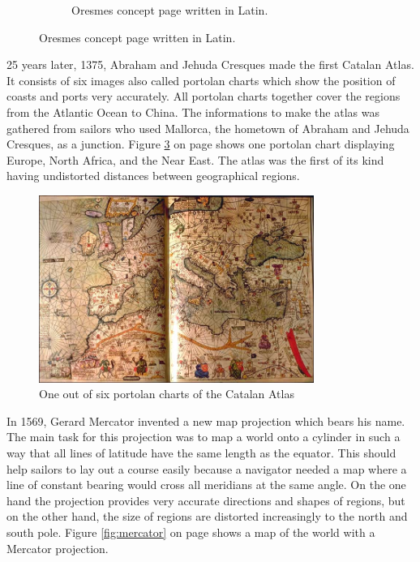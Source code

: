 \begin{figure}[!htb]
\begin{subfigure}[t]{0.4\textwidth}
    \caption{Oresmes concept page written in Latin.}
    \label{fig:oresme-page}
  \end{subfigure}
  \caption[
    Oresmes concept page written in Latin, Urldate: 07.2016 \newline
    \small\texttt{\url{http://datavis.ca/milestones//admin/uploads/images/icons/oresmekl.gif}} \newline
    \small\texttt{\url{http://datavis.ca/milestones//admin/uploads/images/oresme6.gif}}
  ]{
    Oresmes concept page written in Latin.
  }
\end{figure}

25 years later, 1375, Abraham and Jehuda Cresques made the first Catalan Atlas. It consists of six images also called portolan charts which show the position of coasts and ports very accurately. All portolan charts together cover the regions from the Atlantic Ocean to China. The informations to make the atlas was gathered from sailors who used Mallorca, the hometown of Abraham and Jehuda Cresques, as a junction. Figure \ref{fig:catalan-atlas} on page \pageref{fig:catalan-atlas} shows one portolan chart displaying Europe, North Africa, and the Near East. The atlas was the first of its kind having undistorted distances between geographical regions.

\begin{figure}[!htb]
\centering
\includegraphics[width=0.8\textwidth,keepaspectratio]{images/history/catalan-atlas.jpg}
\caption[
    One out of six portolan charts of the Catalan Atlas, Urldate: 07.2016 \newline
\small\texttt{\url{http://datavis.ca/milestones//admin/uploads/images/CatalanE.jpg}}
]{One out of six portolan charts of the Catalan Atlas}
\label{fig:catalan-atlas}
\end{figure}

In 1569, Gerard Mercator invented a new map projection which bears his name. The main task for this projection was to map a world onto a cylinder in such a way that all lines of latitude have the same length as the equator. This should help sailors to lay out a course easily because a navigator needed a map where a line of constant bearing would cross all meridians at the same angle. On the one hand the projection provides very accurate directions and shapes of regions, but on the other hand, the size of regions are distorted increasingly to the north and south pole. Figure \ref{fig:mercator} on page \pageref{fig:mercator} shows a map of the world with a Mercator projection.

